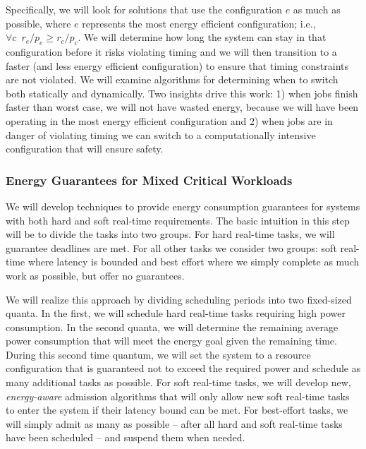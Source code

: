 Specifically, we will look for solutions that use the configuration
$e$ as much as possible, where $e$ represents the most energy
efficient configuration; i.e., $\forall c \,\,\, r_e /p_e \ge
r_c/p_c$.  We will determine how long the system can stay in that
configuration before it risks violating timing and we will then
transition to a faster (and less energy efficient configuration) to
ensure that timing constraints are not violated.  We will examine
algorithms for determining when to switch both statically and
dynamically.  Two insights drive this work: 1) when jobs finish faster
than worst case, we will not have wasted energy, because we will have
been operating in the most energy efficient configuration and 2) when
jobs are in danger of violating timing we can switch to a
computationally intensive configuration that will ensure safety.



\subsubsection{Energy Guarantees for Mixed Critical Workloads}
We will develop techniques to provide energy consumption guarantees
for systems with both hard and soft real-time requirements.  The basic
intuition in this step will be to divide the tasks into two groups.
For hard real-time tasks, we will guarantee deadlines are met.  For
all other tasks we consider two groups: soft real-time where latency
is bounded and best effort where we simply complete as much work as
possible, but offer no guarantees.

We will realize this approach by dividing scheduling periods into two
fixed-sized quanta.  In the first, we will schedule hard real-time
tasks requiring high power consumption.  In the second quanta,
we will determine the remaining average power consumption that will
meet the energy goal given the remaining time.  During this second
time quantum, we will set the system to a resource configuration that
is guaranteed not to exceed the required power and schedule as many
additional tasks as possible.  For soft real-time tasks, we will
develop new, \emph{energy-aware} admission algorithms that will only
allow new soft real-time tasks to enter the system if their latency
bound can be met.  For best-effort tasks, we will simply admit as many
as possible -- after all hard and soft real-time tasks have been
scheduled -- and suspend them when needed.

